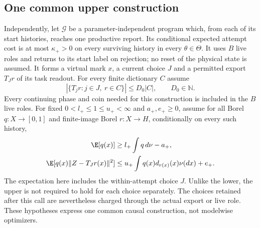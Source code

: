 \subsection*{One common upper construction}\label{sec:upper-cert}
Independently, let $\mathcal G$ be a parameter-independent program which, from each of its start histories, reaches one productive report. Its conditional expected attempt cost is at most $\kappa_+>0$ on every surviving history in every $\theta\in\Theta$. It uses $B$ live roles and returns to its start label on rejection; no reset of the physical state is assumed. It forms a virtual mark $x$, a current choice $J$ and a permitted export $T_Jr$ of its task readout. For every finite dictionary $C$ assume
\begin{equation}\label{eq:exports}
 |\{T_jr:j\in J,\ r\in C\}|\le D_0|C|,
 \qquad D_0\in\mathbb N.
\end{equation}
Every continuing phase and coin needed for this construction is included in the $B$ live roles. For fixed $0<l_+\le1\le u_+<\infty$ and $a_+,e_+\ge0$, assume for all Borel $q:X\to[0,1]$ and finite-image Borel $r:X\to H$, conditionally on every such history,
\begin{align}
 \E[q(x)]&\ge l_+\int q\,d\nu-a_+,\label{eq:upper-mass}\\
 \E[q(x)\|Z-T_Jr(x)\|^2]
 &\le u_+\int q(x)d_{r(x)}(x)\nu(dx)+e_+.
 \label{eq:upper-task}
\end{align}
The expectation here includes the within-attempt choice $J$. Unlike the lower, the upper is not required to hold for each choice separately. The choices retained after this call are nevertheless charged through the actual export or live role. These hypotheses express one common causal construction, not modelwise optimizers.
